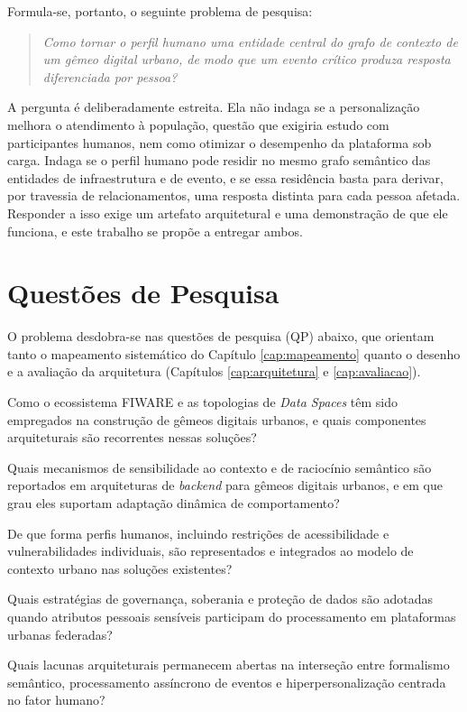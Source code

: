 Formula-se, portanto, o seguinte problema de pesquisa:

\begin{quote}
\textit{Como tornar o perfil humano uma entidade central do grafo de contexto de um gêmeo digital urbano, de modo que um evento crítico produza resposta diferenciada por pessoa?}
\end{quote}

A pergunta é deliberadamente estreita. Ela não indaga se a personalização melhora o atendimento à população, questão que exigiria estudo com participantes humanos, nem como otimizar o desempenho da plataforma sob carga. Indaga se o perfil humano pode residir no mesmo grafo semântico das entidades de infraestrutura e de evento, e se essa residência basta para derivar, por travessia de relacionamentos, uma resposta distinta para cada pessoa afetada. Responder a isso exige um artefato arquitetural e uma demonstração de que ele funciona, e este trabalho se propõe a entregar ambos.

\section{Questões de Pesquisa}
\label{sec:questoes}

O problema desdobra-se nas questões de pesquisa (QP) abaixo, que orientam tanto o mapeamento sistemático do Capítulo \ref{cap:mapeamento} quanto o desenho e a avaliação da arquitetura (Capítulos \ref{cap:arquitetura} e \ref{cap:avaliacao}).

\begin{description}[leftmargin=1.8cm,style=nextline]
	\item[QP1] Como o ecossistema FIWARE e as topologias de \textit{Data Spaces} têm sido empregados na construção de gêmeos digitais urbanos, e quais componentes arquiteturais são recorrentes nessas soluções?
	\item[QP2] Quais mecanismos de sensibilidade ao contexto e de raciocínio semântico são reportados em arquiteturas de \textit{backend} para gêmeos digitais urbanos, e em que grau eles suportam adaptação dinâmica de comportamento?
	\item[QP3] De que forma perfis humanos, incluindo restrições de acessibilidade e vulnerabilidades individuais, são representados e integrados ao modelo de contexto urbano nas soluções existentes?
	\item[QP4] Quais estratégias de governança, soberania e proteção de dados são adotadas quando atributos pessoais sensíveis participam do processamento em plataformas urbanas federadas?
	\item[QP5] Quais lacunas arquiteturais permanecem abertas na interseção entre formalismo semântico, processamento assíncrono de eventos e hiperpersonalização centrada no fator humano?
\end{description}

